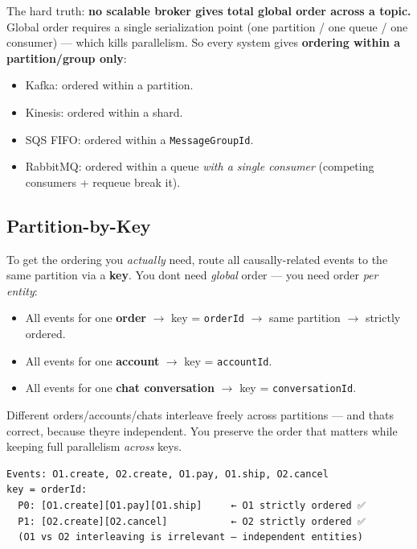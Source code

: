 \documentclass[11pt]{article}
\providecommand{\tightlist}{\setlength{\itemsep}{1pt}\setlength{\parskip}{0pt}}
\begin{document}
The hard truth: \textbf{no scalable broker gives total global order across a topic.} Global order requires a single serialization point (one partition / one queue / one consumer) --- which kills parallelism. So every system gives \textbf{ordering within a partition/group only}:

\begin{itemize}
\tightlist
\item
  Kafka: ordered within a partition.
\item
  Kinesis: ordered within a shard.
\item
  SQS FIFO: ordered within a \texttt{MessageGroupId}.
\item
  RabbitMQ: ordered within a queue \emph{with a single consumer} (competing consumers + requeue break it).
\end{itemize}

\subsection{Partition-by-Key}\label{partition-by-key}

To get the ordering you \emph{actually} need, route all causally-related events to the same partition via a \textbf{key}. You don\textquotesingle t need \emph{global} order --- you need order \emph{per entity}:

\begin{itemize}
\tightlist
\item
  All events for one \textbf{order} \(\rightarrow\) key = \texttt{orderId} \(\rightarrow\) same partition \(\rightarrow\) strictly ordered.
\item
  All events for one \textbf{account} \(\rightarrow\) key = \texttt{accountId}.
\item
  All events for one \textbf{chat conversation} \(\rightarrow\) key = \texttt{conversationId}.
\end{itemize}

Different orders/accounts/chats interleave freely across partitions --- and that\textquotesingle s correct, because they\textquotesingle re independent. You preserve the order that matters while keeping full parallelism \emph{across} keys.

\setcodelang{}

\begin{verbatim}
Events: O1.create, O2.create, O1.pay, O1.ship, O2.cancel
key = orderId:
  P0: [O1.create][O1.pay][O1.ship]     ← O1 strictly ordered ✅
  P1: [O2.create][O2.cancel]           ← O2 strictly ordered ✅
  (O1 vs O2 interleaving is irrelevant — independent entities)
\end{verbatim}
\end{document}
